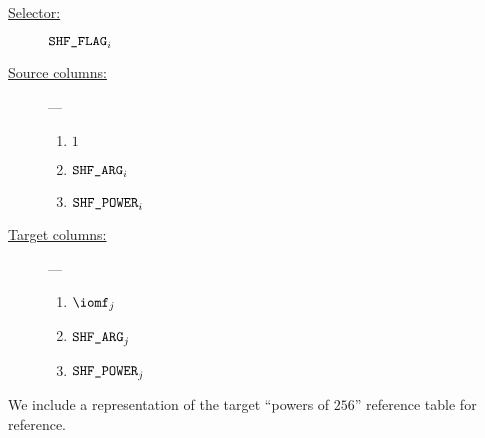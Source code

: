 \begin{description}
	\item[\underline{Selector:}] $\texttt{SHF\_FLAG} _{i}$
	\item[\underline{Source columns:}] ---
		\begin{multicols}{2}
			\begin{enumerate}
				\item $1$
				\item $\texttt{SHF\_ARG}   _{i}$
				\item $\texttt{SHF\_POWER} _{i}$
			\end{enumerate}
		\end{multicols}
	\item[\underline{Target columns:}] ---
		\begin{multicols}{2}
			\begin{enumerate}
				\item $\iomf     _{j}$
				\item $\texttt{SHF\_ARG}   _{j}$
				\item $\texttt{SHF\_POWER} _{j}$
			\end{enumerate}
		\end{multicols}
\end{description}
\saNote{}
We include a representation of the target ``powers of $256$'' reference table for reference.


